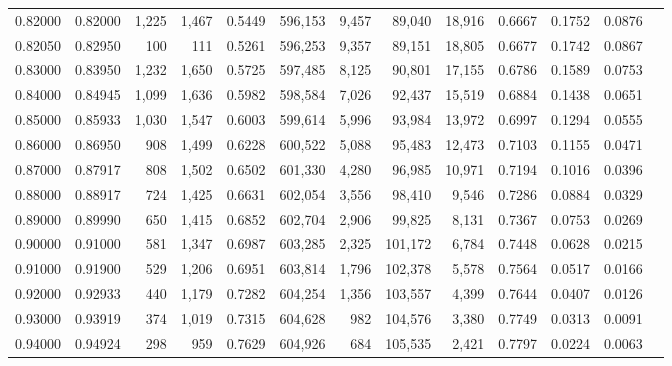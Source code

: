 \begin{tabular}{rrrrrrrrrrrrr}
0.82000 & 0.82000 &  1,225 & 1,467 &                                     0.5449 & 596,153 &   9,457 &  89,040 &  18,916 & 0.6667 & 0.1752 & 0.0876 \\
0.82050 & 0.82950 &    100 &   111 &                                     0.5261 & 596,253 &   9,357 &  89,151 &  18,805 & 0.6677 & 0.1742 & 0.0867 \\
0.83000 & 0.83950 &  1,232 & 1,650 &                                     0.5725 & 597,485 &   8,125 &  90,801 &  17,155 & 0.6786 & 0.1589 & 0.0753 \\
0.84000 & 0.84945 &  1,099 & 1,636 &                                     0.5982 & 598,584 &   7,026 &  92,437 &  15,519 & 0.6884 & 0.1438 & 0.0651 \\
0.85000 & 0.85933 &  1,030 & 1,547 &                                     0.6003 & 599,614 &   5,996 &  93,984 &  13,972 & 0.6997 & 0.1294 & 0.0555 \\
0.86000 & 0.86950 &    908 & 1,499 &                                     0.6228 & 600,522 &   5,088 &  95,483 &  12,473 & 0.7103 & 0.1155 & 0.0471 \\
0.87000 & 0.87917 &    808 & 1,502 &                                     0.6502 & 601,330 &   4,280 &  96,985 &  10,971 & 0.7194 & 0.1016 & 0.0396 \\
0.88000 & 0.88917 &    724 & 1,425 &                                     0.6631 & 602,054 &   3,556 &  98,410 &   9,546 & 0.7286 & 0.0884 & 0.0329 \\
0.89000 & 0.89990 &    650 & 1,415 &                                     0.6852 & 602,704 &   2,906 &  99,825 &   8,131 & 0.7367 & 0.0753 & 0.0269 \\
0.90000 & 0.91000 &    581 & 1,347 &                                     0.6987 & 603,285 &   2,325 & 101,172 &   6,784 & 0.7448 & 0.0628 & 0.0215 \\
0.91000 & 0.91900 &    529 & 1,206 &                                     0.6951 & 603,814 &   1,796 & 102,378 &   5,578 & 0.7564 & 0.0517 & 0.0166 \\
0.92000 & 0.92933 &    440 & 1,179 &                                     0.7282 & 604,254 &   1,356 & 103,557 &   4,399 & 0.7644 & 0.0407 & 0.0126 \\
0.93000 & 0.93919 &    374 & 1,019 &                                     0.7315 & 604,628 &     982 & 104,576 &   3,380 & 0.7749 & 0.0313 & 0.0091 \\
0.94000 & 0.94924 &    298 &   959 &                                     0.7629 & 604,926 &     684 & 105,535 &   2,421 & 0.7797 & 0.0224 & 0.0063 \\

\end{tabular}
